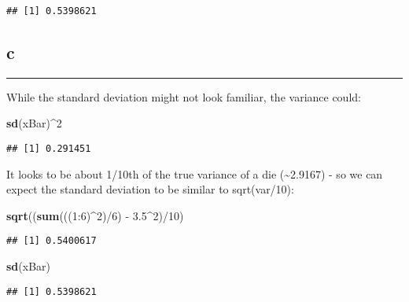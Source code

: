 \documentclass[]{tufte-handout}
\newenvironment{Shaded}{}{}
\newcommand{\DecValTok}[1]{\textcolor[rgb]{0.25,0.63,0.44}{#1}}
\newcommand{\FloatTok}[1]{\textcolor[rgb]{0.25,0.63,0.44}{#1}}
\newcommand{\KeywordTok}[1]{\textcolor[rgb]{0.00,0.44,0.13}{\textbf{#1}}}
\newcommand{\NormalTok}[1]{#1}
\newcommand{\OperatorTok}[1]{\textcolor[rgb]{0.40,0.40,0.40}{#1}}
\newcommand{\StringTok}[1]{\textcolor[rgb]{0.25,0.44,0.63}{#1}}
\begin{document}
\begin{verbatim}
## [1] 0.5398621
\end{verbatim}

\hypertarget{c-5}{%
\subsection{c}\label{c-5}}

\begin{center}\rule{0.5\linewidth}{0.5pt}\end{center}

While the standard deviation might not look familiar, the variance
could:

\begin{Shaded}
\begin{Highlighting}[]
\KeywordTok{sd}\NormalTok{(xBar)}\OperatorTok{^}\DecValTok{2}
\end{Highlighting}
\end{Shaded}

\begin{verbatim}
## [1] 0.291451
\end{verbatim}

It looks to be about 1/10th of the true variance of a die
(\textasciitilde2.9167) - so we can expect the standard deviation to be
similar to sqrt(var/10):

\begin{Shaded}
\begin{Highlighting}[]
\KeywordTok{sqrt}\NormalTok{((}\KeywordTok{sum}\NormalTok{(((}\DecValTok{1}\OperatorTok{:}\DecValTok{6}\NormalTok{)}\OperatorTok{^}\DecValTok{2}\NormalTok{)}\OperatorTok{/}\DecValTok{6}\NormalTok{) }\OperatorTok{-}\StringTok{ }\FloatTok{3.5}\OperatorTok{^}\DecValTok{2}\NormalTok{)}\OperatorTok{/}\DecValTok{10}\NormalTok{)}
\end{Highlighting}
\end{Shaded}

\begin{verbatim}
## [1] 0.5400617
\end{verbatim}

\begin{Shaded}
\begin{Highlighting}[]
\KeywordTok{sd}\NormalTok{(xBar)}
\end{Highlighting}
\end{Shaded}

\begin{verbatim}
## [1] 0.5398621
\end{verbatim}
\end{document}
